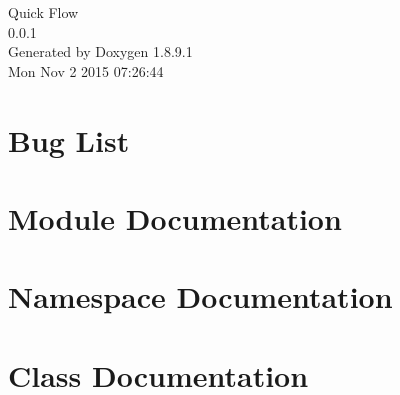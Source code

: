 \documentclass[twoside]{article}
\newcommand{\+}{\discretionary{\mbox{\scriptsize$\hookleftarrow$}}{}{}}
\begin{document}
\hypersetup{pageanchor=false,
             bookmarks=true,
             bookmarksnumbered=true,
             pdfencoding=unicode
            }
\begin{titlepage}
\vspace*{7cm}
\begin{center}%
{\Large Quick Flow \\[1ex]\large 0.\+0.\+1 }\\
\vspace*{1cm}
{\large Generated by Doxygen 1.8.9.1}\\
\vspace*{0.5cm}
{\small Mon Nov 2 2015 07:26:44}\\
\end{center}
\end{titlepage}
\tableofcontents
{}
\hypersetup{pageanchor=true}

\section{Bug List}
\label{bug}
\hypertarget{bug}{}

\section{Module Documentation}




\section{Namespace Documentation}

\section{Class Documentation}




















\end{document}
